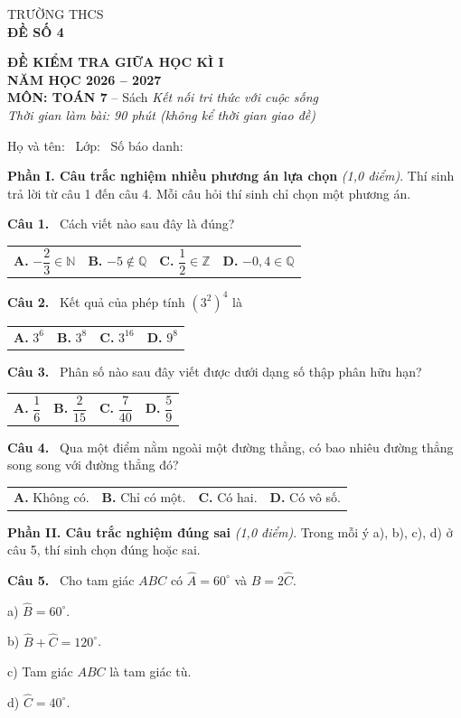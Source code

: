 \documentclass[12pt,a4paper]{article}
\makeatletter
\newcommand{\bonpa}[4]{\par\noindent\begin{tabularx}{\linewidth}{@{\hspace{0.6cm}}XXXX@{}}
\textbf{A.} #1 & \textbf{B.} #2 & \textbf{C.} #3 & \textbf{D.} #4\end{tabularx}\par}
\newcommand{\cau}[1]{\par\medskip\textbf{Câu #1.}~}
\newcommand{\y}[1]{\par\hspace*{0.6cm}#1}
\newcommand{\phan}[1]{\par\bigskip{\large\textbf{#1}}\par\smallskip}
\makeatother
\begin{document}
\noindent
\begin{minipage}[t]{0.38\linewidth}\centering
TRƯỜNG THCS \dotfill\\[2pt]
\textbf{ĐỀ SỐ 4}
\end{minipage}\hfill
\begin{minipage}[t]{0.6\linewidth}\centering
\textbf{ĐỀ KIỂM TRA GIỮA HỌC KÌ I}\\
\textbf{NĂM HỌC 2026 -- 2027}\\
\textbf{MÔN: TOÁN 7} -- Sách \textit{Kết nối tri thức với cuộc sống}\\
\textit{Thời gian làm bài: 90 phút (không kể thời gian giao đề)}
\end{minipage}

\medskip
Họ và tên: \dotfill\ Lớp: \makebox[2cm]{\dotfill}\ Số báo danh: \makebox[2.5cm]{\dotfill}
\phan{A. TRẮC NGHIỆM (3,0 điểm)}
\textbf{Phần I. Câu trắc nghiệm nhiều phương án lựa chọn} \textit{(1,0 điểm)}. Thí sinh trả lời từ câu 1 đến câu 4. Mỗi câu hỏi thí sinh chỉ chọn một phương án.
\cau{1} Cách viết nào sau đây là đúng?
\bonpa{$-\dfrac{2}{3}\in\mathbb{N}$}{$-5\notin\mathbb{Q}$}{$\dfrac{1}{2}\in\mathbb{Z}$}{$-0{,}4\in\mathbb{Q}$}
\cau{2} Kết quả của phép tính $\left(3^{2}\right)^{4}$ là
\bonpa{$3^{6}$}{$3^{8}$}{$3^{16}$}{$9^{8}$}
\cau{3} Phân số nào sau đây viết được dưới dạng số thập phân hữu hạn?
\bonpa{$\dfrac{1}{6}$}{$\dfrac{2}{15}$}{$\dfrac{7}{40}$}{$\dfrac{5}{9}$}
\cau{4} Qua một điểm nằm ngoài một đường thẳng, có bao nhiêu đường thẳng song song với đường thẳng đó?
\bonpa{Không có.}{Chỉ có một.}{Có hai.}{Có vô số.}

\medskip\textbf{Phần II. Câu trắc nghiệm đúng sai} \textit{(1,0 điểm)}. Trong mỗi ý a), b), c), d) ở câu 5, thí sinh chọn đúng hoặc sai.
\cau{5} Cho tam giác $ABC$ có $\widehat{A}=60^\circ$ và $\widehat{B}=2\widehat{C}$.
\y{a) $\widehat{B}=60^\circ$.}
\y{b) $\widehat{B}+\widehat{C}=120^\circ$.}
\y{c) Tam giác $ABC$ là tam giác tù.}
\y{d) $\widehat{C}=40^\circ$.}
\end{document}

